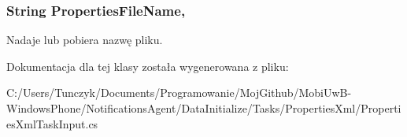 \subsubsection[{Properties\+File\+Name}]{\setlength{\rightskip}{0pt plus 5cm}String Properties\+File\+Name\hspace{0.3cm}{\ttfamily [get]}, {\ttfamily [set]}}\label{a00044_a5c0687a9de894eb0c7065c281897734b}


Nadaje lub pobiera nazwę pliku. 



Dokumentacja dla tej klasy została wygenerowana z pliku\+:\begin{DoxyCompactItemize}
\item 
C\+:/\+Users/\+Tunczyk/\+Documents/\+Programowanie/\+Moj\+Github/\+Mobi\+Uw\+B-\/\+Windows\+Phone/\+Notifications\+Agent/\+Data\+Initialize/\+Tasks/\+Properties\+Xml/Properties\+Xml\+Task\+Input.\+cs\end{DoxyCompactItemize}
